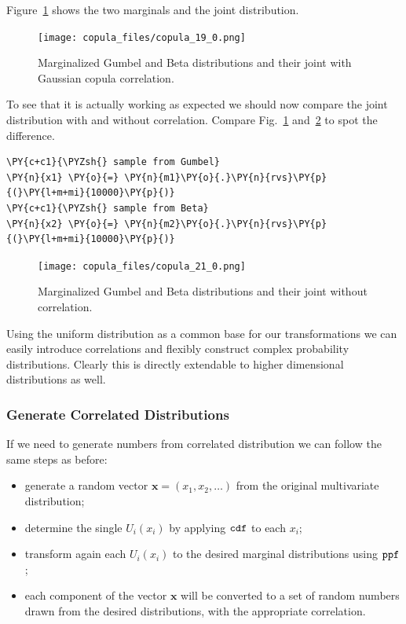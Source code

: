 Figure~\ref{fig:gumbel_beta_with_corr} shows the two marginals and the joint distribution.

\begin{figure}[htbp]
  \centering
  \texttt{[image: copula\_files/copula\_19\_0.png]}
  \caption{Marginalized Gumbel and Beta distributions and their joint with Gaussian copula correlation.}
  \label{fig:gumbel_beta_with_corr}
\end{figure}
    
To see that it is actually working as expected we should now compare the joint
distribution with and without correlation. Compare Fig.~\ref{fig:gumbel_beta_with_corr} and~\ref{fig:gumbel_beta_without_corr} to spot the difference.

\begin{tcolorbox}[breakable, size=fbox, boxrule=1pt, pad at break*=1mm,colback=cellbackground, colframe=cellborder]
\begin{Verbatim}[commandchars=\\\{\}]
\PY{c+c1}{\PYZsh{} sample from Gumbel}
\PY{n}{x1} \PY{o}{=} \PY{n}{m1}\PY{o}{.}\PY{n}{rvs}\PY{p}{(}\PY{l+m+mi}{10000}\PY{p}{)}
\PY{c+c1}{\PYZsh{} sample from Beta}
\PY{n}{x2} \PY{o}{=} \PY{n}{m2}\PY{o}{.}\PY{n}{rvs}\PY{p}{(}\PY{l+m+mi}{10000}\PY{p}{)}
\end{Verbatim}
\end{tcolorbox}

\begin{figure}[htbp]
  \centering
  \texttt{[image: copula\_files/copula\_21\_0.png]}
  \caption{Marginalized Gumbel and Beta distributions and their joint without correlation.}
  \label{fig:gumbel_beta_without_corr}
\end{figure}
    
Using the uniform distribution as a common base for our transformations
we can easily introduce correlations and flexibly construct complex
probability distributions. Clearly this is directly extendable to
higher dimensional distributions as well.

\subsubsection{Generate Correlated Distributions}\label{generate-correlated-distributions}

If we need to generate numbers from correlated distribution we can
follow the same steps as before:

\begin{itemize}
\tightlist
\item
  generate a random vector \(\mathbf{x}=(x_1, x_2,\ldots)\) from the
  original multivariate distribution;
\item
  determine the single \(U_i(x_i)\) by applying \(\tt{cdf}\) to each
  \(x_i\);
\item
  transform again each \(U_i(x_i)\) to the desired marginal
  distributions using \(\tt{ppf}\);
\item
  each component of the vector \(\mathbf{x}\) will be converted to a set
  of random numbers drawn from the desired distributions, with the
  appropriate correlation.
\end{itemize}


